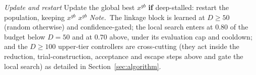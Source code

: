 \begin{algorithm}[p]
\begin{algorithmic}[1]
  \Statex
  \Statex \quad\emph{Update and restart}
  \State Update the global best $x^{gb}$
  \State \textbf{if} deep-stalled: restart the population, keeping $x^{gb}$
\EndWhile
\Statex
\State \Return $x^{gb}$
\Statex
\Statex \emph{Note.}~\textnormal{The linkage block is learned at $D{\ge}50$ (random otherwise) and confidence-gated; the
local search enters at $0.80$ of the budget below $D{=}50$ and at $0.70$ above, under its evaluation
cap and cooldown; and the $D{\ge}100$ upper-tier controllers are cross-cutting (they act inside the
reduction, trial-construction, acceptance and escape steps above and gate the local search) as
detailed in Section~\ref{sec:algorithm}.}
\end{algorithmic}
\end{algorithm}
